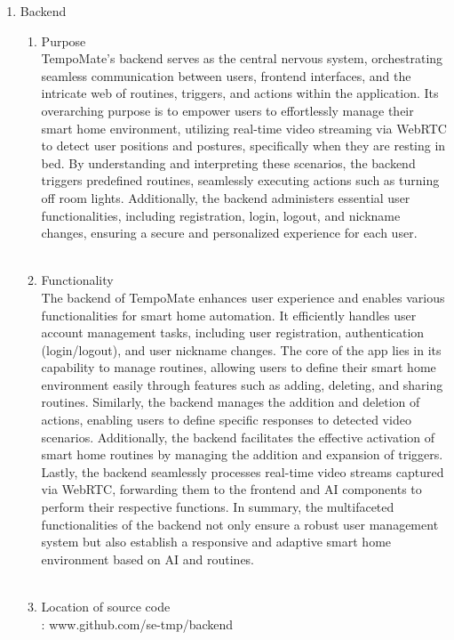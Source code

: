 \begin{enumerate}[label=\arabic*]
\begin{enumerate}[label=\alph*]
        \item Backend\\
        \begin{enumerate}
            \item Purpose \\
            TempoMate's backend serves as the central nervous system, orchestrating seamless communication between users, frontend interfaces, and the intricate web of routines, triggers, and actions within the application. Its overarching purpose is to empower users to effortlessly manage their smart home environment, utilizing real-time video streaming via WebRTC to detect user positions and postures, specifically when they are resting in bed. By understanding and interpreting these scenarios, the backend triggers predefined routines, seamlessly executing actions such as turning off room lights. Additionally, the backend administers essential user functionalities, including registration, login, logout, and nickname changes, ensuring a secure and personalized experience for each user. \\\\
            \item Functionality \\
            The backend of TempoMate enhances user experience and enables various functionalities for smart home automation. It efficiently handles user account management tasks, including user registration, authentication (login/logout), and user nickname changes. The core of the app lies in its capability to manage routines, allowing users to define their smart home environment easily through features such as adding, deleting, and sharing routines. Similarly, the backend manages the addition and deletion of actions, enabling users to define specific responses to detected video scenarios. Additionally, the backend facilitates the effective activation of smart home routines by managing the addition and expansion of triggers. Lastly, the backend seamlessly processes real-time video streams captured via WebRTC, forwarding them to the frontend and AI components to perform their respective functions. In summary, the multifaceted functionalities of the backend not only ensure a robust user management system but also establish a responsive and adaptive smart home environment based on AI and routines. \\\\
            \item Location of source code \\
            : www.github.com/se-tmp/backend \\\\

\end{enumerate}
\end{enumerate}
\end{enumerate}
